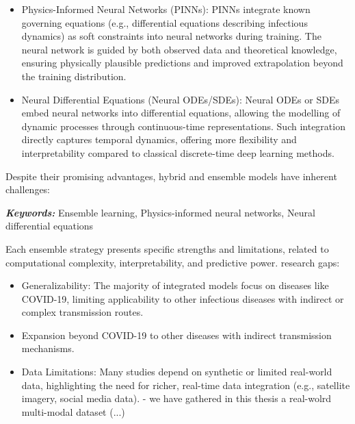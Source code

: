 \begin{itemize}
    \item Physics-Informed Neural Networks (PINNs): PINNs integrate known governing equations (e.g., differential equations describing infectious dynamics) as soft constraints into neural networks during training. The neural network is guided by both observed data and theoretical knowledge, ensuring physically plausible predictions and improved extrapolation beyond the training distribution.
    \item Neural Differential Equations (Neural ODEs/SDEs): Neural ODEs or SDEs embed neural networks into differential equations, allowing the modelling of dynamic processes through continuous-time representations. Such integration directly captures temporal dynamics, offering more flexibility and interpretability compared to classical discrete-time deep learning methods.
\end{itemize}

Despite their promising advantages, hybrid and ensemble models have inherent challenges:

\textit{\textbf{Keywords:}} Ensemble learning, Physics-informed neural networks, Neural differential equations


Each ensemble strategy presents specific strengths and limitations, related to computational complexity, interpretability, and predictive power. 
research gaps:
\begin{itemize}
    \item Generalizability: The majority of integrated models focus on diseases like COVID-19, limiting applicability to other infectious diseases with indirect or complex transmission routes.
    \item Expansion beyond COVID-19 to other diseases with indirect transmission mechanisms.
    \item Data Limitations: Many studies depend on synthetic or limited real-world data, highlighting the need for richer, real-time data integration (e.g., satellite imagery, social media data). - we have gathered in this thesis a real-wolrd multi-modal dataset (...)
\end{itemize}

